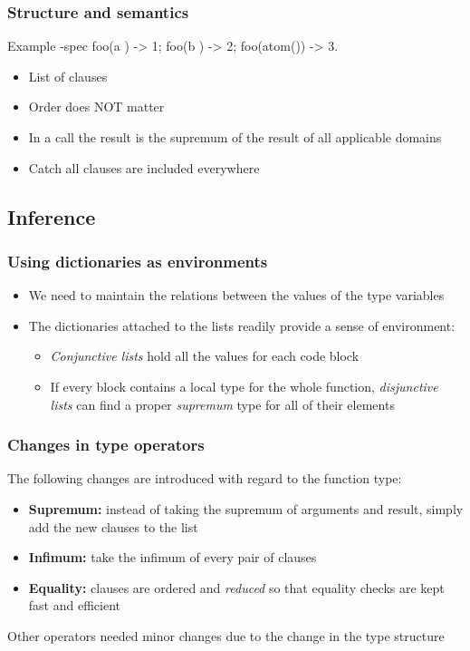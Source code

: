 \documentclass{beamer}
\begin{document}
\begin{frame}[fragile]
  \frametitle{Structure and semantics}
  \begin{code}{Example}
-spec foo(a     ) -> 1;
      foo(b     ) -> 2;
      foo(atom()) -> 3.
  \end{code}
  \begin{itemize}
  \item List of clauses \pause
  \item Order does NOT matter \pause
  \item In a call the result is the supremum of the result of all
    applicable domains \pause
  \item Catch all clauses are included everywhere
  \end{itemize}
\end{frame}

\subsection{Inference}

\begin{frame}
  \frametitle{Using dictionaries as environments}
  \begin{itemize}
    \item We need to maintain the relations between the values of the
      type variables \pause
    \item The dictionaries attached to the lists readily provide a
      sense of environment: \pause
      \begin{itemize}
      \item \emph{Conjunctive lists} hold all the values for each code
        block \pause
      \item If every block contains a local type for the whole
        function, \emph{disjunctive lists} can find a proper
        \emph{supremum} type for all of their elements
      \end{itemize}
  \end{itemize}
\end{frame}

\begin{frame}
  \frametitle{Changes in type operators} 
  The following changes are introduced with regard to the function
  type: \pause
  \begin{itemize}
  \item \textbf{Supremum:} instead of taking the supremum of arguments
    and result, simply add the new clauses to the list \pause
  \item \textbf{Infimum:} take the infimum of every pair of clauses
    \pause
  \item \textbf{Equality:} clauses are ordered and \emph{reduced} so
    that equality checks are kept fast and efficient
  \end{itemize} 
  Other operators needed minor changes due to the change in the type
  structure
\end{frame}
\end{document}

